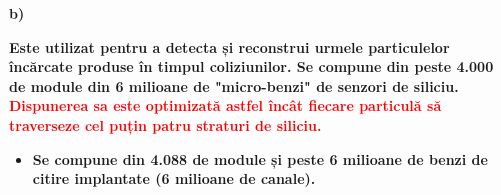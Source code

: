 \documentclass{beamer}
\begin{document}
\begin{frame}{\textbf{b) }}

 \small
 
\vspace{-1.8cm}

\makebox[0.5cm]{}\textbf{ Este utilizat pentru a detecta și reconstrui urmele particulelor încărcate produse în timpul coliziunilor. Se compune din peste 4.000 de module din 6 milioane de "micro-benzi" de senzori de siliciu. \textcolor{red} {Dispunerea sa este optimizată astfel încât fiecare particulă să traverseze cel puțin patru straturi de siliciu.} }

\vspace{4cm}
\begin{itemize}

\item[\ding{34}] \makebox[0.5cm]{}\textbf{ Se compune din 4.088 de module și peste 6 milioane de benzi de citire implantate (6 milioane de canale).}
\end{itemize}

\end{frame}
\end{document}
